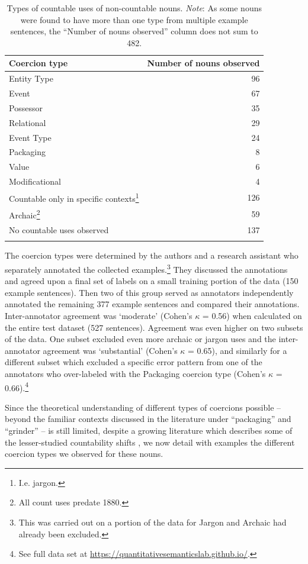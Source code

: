 \documentclass[output=paper]{langscibook}
\begin{document}
\begin{table}
    \begin{tabular}{lr}
    \lsptoprule
        Coercion type    &  Number of nouns observed \\ 
  \midrule
 Entity Type  & 96 \\
 Event  & 67 \\ 
 Possessor  & 35 \\
 Relational & 29 \\
 Event Type  & 24 \\
 Packaging  & 8 \\
 Value & 6 \\
 Modificational & 4 \\
 Countable only in specific contexts\footnote{I.e. jargon.} & 126 \\
 Archaic\footnote{All count uses predate 1880.} & 59 \\
  No countable uses observed & 137 \\
  \lspbottomrule
\end{tabular}
    \caption{Types of countable uses of non-countable nouns. \emph{Note}: As some nouns were found to have more than one type from multiple example sentences, the ``Number of nouns observed'' column does not sum to 482.\label{gri-ric:tab:coercion}}
\end{table}


The coercion types were determined by the authors and a research assistant who separately annotated the collected examples.\footnote{This was carried out on a portion of the data for Jargon and Archaic had already been excluded.} They discussed the annotations and agreed upon a final set of labels on a small training portion of the data (150 example sentences). Then two of this group served as annotators independently annotated the remaining 377 example sentences and compared their annotations.  Inter-annotator agreement was `moderate' (Cohen's $\kappa$ = 0.56) when calculated on the entire test dataset (527 sentences). Agreement was even higher on two subsets of the data.   One subset excluded even more archaic or jargon uses and the inter-annotator agreement was `substantial' (Cohen's $\kappa$ = 0.65), and similarly for a different subset which excluded a specific error pattern from one of the annotators who over-labeled with the Packaging coercion type (Cohen's $\kappa$ = 0.66).\footnote{See full data set at \url{https://quantitativesemanticslab.github.io/}.}


Since the theoretical understanding of different types of coercions possible -- beyond the familiar contexts discussed in the literature under ``packaging'' and ``grinder''  -- is still limited, despite a growing literature which describes some of the lesser-studied countability shifts \citep{Huddleston2002,grimm2014individuating,Husic2020,ZamparelliToAppear},   we now detail with examples the different coercion types we observed for these nouns.
\end{document}
